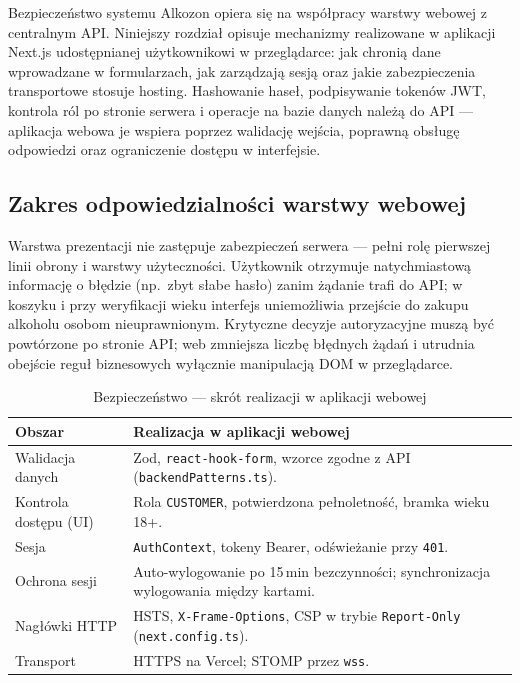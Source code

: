 \documentclass[12pt,a4paper]{report}
\newcommand{\blok}[1]{\needspace{9\baselineskip}#1}
\newcommand{\tabela}[1]{\needspace{11\baselineskip}#1}
\newenvironment{calosc}{%
  \Needspace{17\baselineskip}%
  \begin{samepage}%
}{%
  \end{samepage}%
}
\begin{document}
\blok{%
Bezpieczeństwo systemu Alkozon opiera się na współpracy warstwy webowej z centralnym API. Niniejszy rozdział opisuje mechanizmy realizowane w aplikacji Next.js udostępnianej użytkownikowi w przeglądarce: jak chronią dane wprowadzane w formularzach, jak zarządzają sesją oraz jakie zabezpieczenia transportowe stosuje hosting. Hashowanie haseł, podpisywanie tokenów JWT, kontrola ról po stronie serwera i operacje na bazie danych należą do API --- aplikacja webowa je wspiera poprzez walidację wejścia, poprawną obsługę odpowiedzi oraz ograniczenie dostępu w interfejsie.
}

\begin{calosc}
\section{Zakres odpowiedzialności warstwy webowej}

Warstwa prezentacji nie zastępuje zabezpieczeń serwera --- pełni rolę pierwszej linii obrony i warstwy użyteczności. Użytkownik otrzymuje natychmiastową informację o błędzie (np.\ zbyt słabe hasło) zanim żądanie trafi do API; w koszyku i przy weryfikacji wieku interfejs uniemożliwia przejście do zakupu alkoholu osobom nieuprawnionym. Krytyczne decyzje autoryzacyjne muszą być powtórzone po stronie API; web zmniejsza liczbę błędnych żądań i utrudnia obejście reguł biznesowych wyłącznie manipulacją DOM w przeglądarce.

\tabela{%
\begin{table}[H]
  \centering
  \caption{Bezpieczeństwo --- skrót realizacji w aplikacji webowej}
  \label{tab:security}
  \begin{tabularx}{\textwidth}{@{}lX@{}}
    \toprule
    \textbf{Obszar} & \textbf{Realizacja w aplikacji webowej} \\
    \midrule
    Walidacja danych & Zod, \texttt{react-hook-form}, wzorce zgodne z API (\texttt{backendPatterns.ts}). \\
    Kontrola dostępu (UI) & Rola \texttt{CUSTOMER}, potwierdzona pełnoletność, bramka wieku 18+. \\
    Sesja & \texttt{AuthContext}, tokeny Bearer, odświeżanie przy \texttt{401}. \\
    Ochrona sesji & Auto-wylogowanie po 15\,min bezczynności; synchronizacja wylogowania między kartami. \\
    Nagłówki HTTP & HSTS, \texttt{X-Frame-Options}, CSP w trybie \texttt{Report-Only} (\texttt{next.config.ts}). \\
    Transport & HTTPS na Vercel; STOMP przez \texttt{wss}. \\
    \bottomrule
  \end{tabularx}
\end{table}
}
\end{calosc}
\end{document}
